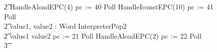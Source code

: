 \begin{figure}[p!]
\begin{circus}
    \t2 HandleAloadEPC(4) \circseq pc := 40 \circseq Poll \circseq HandleIconstEPC(10) \circseq  pc := 41 \circseq Poll \circseq \\
    \t2 \circvar value1, value2 : Word \circspot InterpreterPop2 \circseq \\
    \t2 \circif value1 \leq value2 \circthen pc := 21 \circseq Poll \circseq HandleAloadEPC(2) \circseq pc := 22 \circseq Poll \circseq \\
    \t3 {} \cdots {} \\

\end{circus}
\end{figure}
